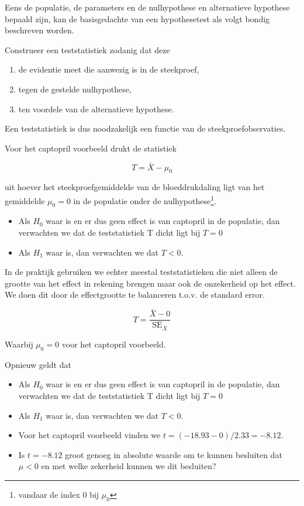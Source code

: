 \documentclass[
  12pt,dutch,coursenotes]{book}
\providecommand{\tightlist}{%
  \setlength{\itemsep}{0pt}\setlength{\parskip}{0pt}}
\begin{document}
Eens de populatie, de parameters en de nulhypothese en alternatieve hypothese bepaald zijn, kan de basisgedachte van een hypothesetest als volgt bondig beschreven worden.

Construeer een teststatistiek zodanig dat deze

\begin{enumerate}
\def\labelenumi{\arabic{enumi}.}
\tightlist
\item
  de evidentie meet die aanwezig is in de steekproef,
\item
  tegen de gestelde nulhypothese,
\item
  ten voordele van de alternatieve hypothese.
\end{enumerate}

Een teststatistiek is dus noodzakelijk een functie van de steekproefobservaties.

Voor het captopril voorbeeld drukt de statistiek

\[T=\bar X - \mu_0\]

uit hoever het steekproefgemiddelde van de bloeddrukdaling ligt van het gemiddelde \(\mu_0=0\) in de populatie onder de nulhypothese\footnote{vandaar de index 0 bij \(\mu_0\)}.

\begin{itemize}
\tightlist
\item
  Als \(H_0\) waar is en er dus geen effect is van captopril in de populatie, dan verwachten we dat de teststatistiek T dicht ligt bij \(T=0\)
\item
  Als \(H_1\) waar is, dan verwachten we dat \(T<0\).
\end{itemize}

In de praktijk gebruiken we echter meestal teststatistieken die niet alleen de grootte van het effect in rekening brengen maar ook de onzekerheid op het effect.
We doen dit door de effectgrootte te balanceren t.o.v. de standard error.

\[T=\frac{\bar{X}-0}{\text{SE}_{\bar X}}\]

Waarbij \(\mu_0=0\) voor het captopril voorbeeld.

Opnieuw geldt dat

\begin{itemize}
\tightlist
\item
  Als \(H_0\) waar is en er dus geen effect is van captopril in de populatie, dan verwachten we dat de teststatistiek T dicht ligt bij \(T=0\)
\item
  Als \(H_1\) waar is, dan verwachten we dat \(T<0\).
\item
  Voor het captopril voorbeeld vinden we \(t=(-18.93-0)/2.33=-8.12\).
\item
  Is \(t = -8.12\) groot genoeg in absolute waarde om te kunnen besluiten dat \(\mu < 0\) en met welke zekerheid kunnen we dit besluiten?
\end{itemize}
\end{document}
